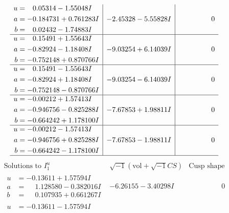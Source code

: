 \documentclass[1p]{elsarticle_modified}
\theoremstyle{definition}
\newcommand{\I}{\sqrt{-1}}
\begin{document}
$$\begin{array}{c|c|c}
\begin{aligned}
u &= \phantom{-}0.05314 - 1.55048 I \\
a &= -0.184731 + 0.761283 I \\
b &= \phantom{-}0.02432 - 1.74883 I\end{aligned}
 & -2.45328 - 5.55828 I & \phantom{-0.000000 } 0 \\ \hline\begin{aligned}
u &= \phantom{-}0.15491 + 1.55643 I \\
a &= -0.82924 - 1.18408 I \\
b &= -0.752148 + 0.870766 I\end{aligned}
 & -9.03254 + 6.14039 I & \phantom{-0.000000 } 0 \\ \hline\begin{aligned}
u &= \phantom{-}0.15491 - 1.55643 I \\
a &= -0.82924 + 1.18408 I \\
b &= -0.752148 - 0.870766 I\end{aligned}
 & -9.03254 - 6.14039 I & \phantom{-0.000000 } 0 \\ \hline\begin{aligned}
u &= -0.00212 + 1.57413 I \\
a &= -0.946756 - 0.825288 I \\
b &= -0.664242 + 1.178100 I\end{aligned}
 & -7.67853 + 1.98811 I & \phantom{-0.000000 } 0 \\ \hline\begin{aligned}
u &= -0.00212 - 1.57413 I \\
a &= -0.946756 + 0.825288 I \\
b &= -0.664242 - 1.178100 I\end{aligned}
 & -7.67853 - 1.98811 I & \phantom{-0.000000 } 0\\
 \hline 
 \end{array}$$\newpage$$\begin{array}{c|c|c}  
\text{Solutions to }I^u_{1}& \I (\text{vol} + \sqrt{-1}CS) & \text{Cusp shape}\\
 \hline 
\begin{aligned}
u &= -0.13611 + 1.57594 I \\
a &= \phantom{-}1.128580 - 0.382016 I \\
b &= \phantom{-}0.107935 + 0.661267 I\end{aligned}
 & -6.26155 - 3.40298 I & \phantom{-0.000000 } 0 \\ \hline\begin{aligned}
u &= -0.13611 - 1.57594 I \\

\end{aligned}
\end{array}$$
\end{document}
